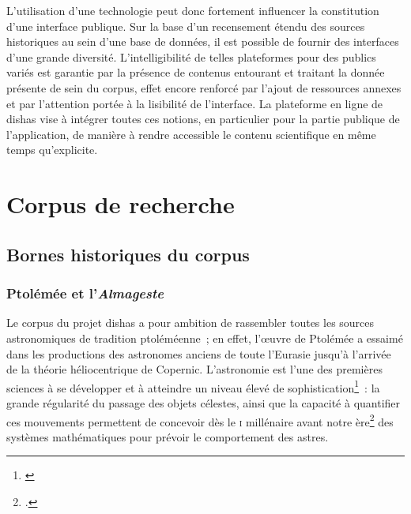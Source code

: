 \documentclass[a4paper,12pt,twoside]{book}
\newcommand{\clearemptydoublepage}{\newpage{\pagestyle{empty}\cleardoublepage}}
\newcommand{\I}{\textsc{i}\ieme{}\xspace}
\newcommand{\dishas}{\gls{dishas}\xspace}
\begin{document}
L'utilisation d'une technologie peut donc fortement influencer la constitution d'une interface publique. Sur la base d'un recensement étendu des sources historiques au sein d'une base de données, il est possible de fournir des interfaces d'une grande diversité. L'intelligibilité de telles plateformes pour des publics variés est garantie par la présence de contenus entourant et traitant la donnée présente de sein du corpus, effet encore renforcé par l'ajout de ressources annexes et par l'attention portée à la lisibilité de l'interface. La plateforme en ligne de \dishas vise à intégrer toutes ces notions, en particulier pour la partie publique de l'application, de manière à rendre accessible le contenu scientifique en même temps qu'explicite.

\clearemptydoublepage

\chapter{Corpus de recherche}
	\section{Bornes historiques du corpus}
		\subsection{Ptolémée et l'\emph{Almageste}}
Le corpus du projet \dishas a pour ambition de rassembler toutes les sources astronomiques de tradition ptoléméenne~; en effet, l'œuvre de Ptolémée a essaimé dans les productions des astronomes anciens de toute l'Eurasie jusqu'à l'arrivée de la théorie héliocentrique de Copernic. L'astronomie est l'une des premières sciences à se développer et à atteindre un niveau élevé de sophistication\footnote{\cite{evansHistoryAstronomy}}~: la grande régularité du passage des objets célestes, ainsi que la capacité à quantifier ces mouvements permettent de concevoir dès le \I millénaire avant notre ère\footcite{evansHistoryAstronomy} des systèmes mathématiques pour prévoir le comportement des astres.\\
\end{document}
